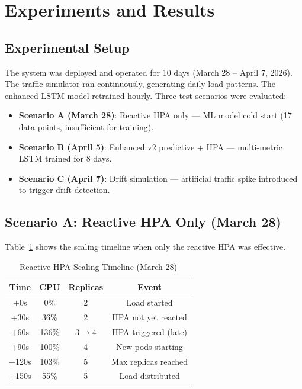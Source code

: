 \documentclass[journal]{IEEEtran}
\begin{document}
\section{Experiments and Results}
\label{sec:experiments}

\subsection{Experimental Setup}
The system was deployed and operated for 10 days (March 28 -- April 7, 2026). The traffic simulator ran continuously, generating daily load patterns. The enhanced LSTM model retrained hourly. Three test scenarios were evaluated:

\begin{itemize}
    \item \textbf{Scenario A (March 28)}: Reactive HPA only --- ML model cold start (17 data points, insufficient for training).
    \item \textbf{Scenario B (April 5)}: Enhanced v2 predictive + HPA --- multi-metric LSTM trained for 8 days.
    \item \textbf{Scenario C (April 7)}: Drift simulation --- artificial traffic spike introduced to trigger drift detection.
\end{itemize}

\subsection{Scenario A: Reactive HPA Only (March 28)}
Table~\ref{tab:before} shows the scaling timeline when only the reactive HPA was effective.

\begin{table}[h]
\centering
\caption{Reactive HPA Scaling Timeline (March 28)}
\label{tab:before}
\begin{tabular}{@{}cccc@{}}
\toprule
\textbf{Time} & \textbf{CPU} & \textbf{Replicas} & \textbf{Event} \\
\midrule
+0s & 0\% & 2 & Load started \\
+30s & 36\% & 2 & HPA not yet reacted \\
+60s & 136\% & 3$\rightarrow$4 & HPA triggered (late) \\
+90s & 100\% & 4 & New pods starting \\
+120s & 103\% & 5 & Max replicas reached \\
+150s & 55\% & 5 & Load distributed \\
\bottomrule
\end{tabular}
\end{table}
\end{document}
